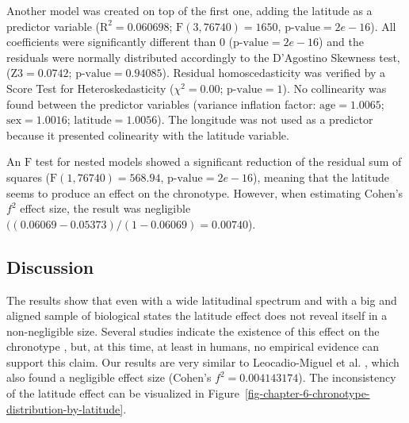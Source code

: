 \documentclass[
12pt,
openright,
oneside,
a4paper,
chapter=TITLE,
section=TITLE,
french,
spanish,
brazil,
english
]{abntex2}\usepackage{array}
\begin{document}
Another model was created on top of the first one, adding the latitude
as a predictor variable (\(\text{R}^{2} = 0.060698\);
\(\text{F}(3, 76740) = 1650\), \(\text{p-value} = 2e-16\)). All
coefficients were significantly different than 0
(\(\text{p-value} = 2e-16\)) and the residuals were normally distributed
accordingly to the D'Agostino Skewness test, (\(\text{Z3} = 0.0742\);
\(\text{p-value} = 0.94085\)). Residual homoscedasticity was verified by
a Score Test for Heteroskedasticity (\(\chi^{2} = 0.00\);
\(\text{p-value} = 1\)). No collinearity was found between the predictor
variables (variance inflation factor: \(\text{age} = 1.0065\);
\(\text{sex} = 1.0016\); \(\text{latitude} = 1.0056\)). The longitude
was not used as a predictor because it presented colinearity with the
latitude variable.

An \(\text{F}\) test for nested models showed a significant reduction of
the residual sum of squares (\(\text{F}(1, 76740) = 568.94\),
\(\text{p-value} = 2e-16\)), meaning that the latitude seems to produce
an effect on the chronotype. However, when estimating Cohen's \(f^2\)
effect size, the result was negligible \autocite{cohen1992}
\(((0.06069 - 0.05373) / (1 - 0.06069) = 0.00740\)).

\subsection{Discussion}\label{discussion}

The results show that even with a wide latitudinal spectrum and with a
big and aligned sample of biological states the latitude effect does not
reveal itself in a non-negligible size. Several studies indicate the
existence of this effect on the chronotype
\autocite{hut2013,leocadio-miguel2017,pittendrigh1991,randler2008,randler2017,roenneberg2003},
but, at this time, at least in humans, no empirical evidence can support
this claim. Our results are very similar to Leocadio-Miguel et al.
\autocite*{leocadio-miguel2017}, which also found a negligible effect
size (Cohen's \(f^{2} = 0.004143174\)). The inconsistency of the
latitude effect can be visualized in
Figure~\ref{fig-chapter-6-chronotype-distribution-by-latitude}.
\end{document}
